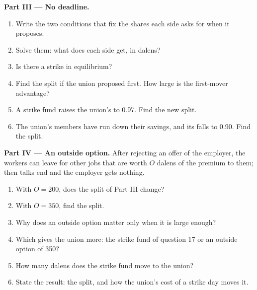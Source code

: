 \begin{problem}
\medskip
\noindent\textbf{Part III --- No deadline.}
\begin{enumerate}[resume]
  \item Write the two conditions that fix the shares each side asks for when it proposes.
  \item Solve them: what does each side get, in dalens?
  \item Is there a strike in equilibrium?
  \item Find the split if the union proposed first. How large is the first-mover advantage?
  \item A strike fund raises the union's  to 0.97. Find the new split.
  \item The union's members have run down their savings, and its  falls to 0.90. Find the split.
\end{enumerate}

\medskip
\noindent\textbf{Part IV --- An outside option.} After rejecting an offer of the employer, the workers can leave for
other jobs that are worth $O$ dalens of the premium to them; then talks end and the employer gets nothing.
\begin{enumerate}[resume]
  \item With $O = 200$, does the split of Part III change?
  \item With $O = 350$, find the split.
  \item Why does an outside option matter only when it is large enough?
  \item Which gives the union more: the strike fund of question 17 or an outside option of 350?
  \item How many dalens does the strike fund move to the union?
  \item State the result: the split, and how the union's cost of a strike day moves it.
\end{enumerate}
\end{problem}
